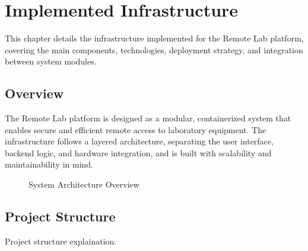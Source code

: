 %
%
\chapter{Implemented Infrastructure} \label{cap:implemented-infrastructure}

This chapter details the infrastructure implemented for the Remote Lab platform, covering the main components, technologies, deployment strategy, and integration between system modules.

\section{Overview}

The Remote Lab platform is designed as a modular, containerized system that enables secure and efficient remote access to laboratory equipment. The infrastructure follows a layered architecture, separating the user interface, backend logic, and hardware integration, and is built with scalability and maintainability in mind.

\begin{figure}[h]
    \begin{center}
    \end{center}
    \caption{System Architecture Overview}
    \label{fig:system-architecture}
\end{figure}

\section{Project Structure}
Project structure explaination.

